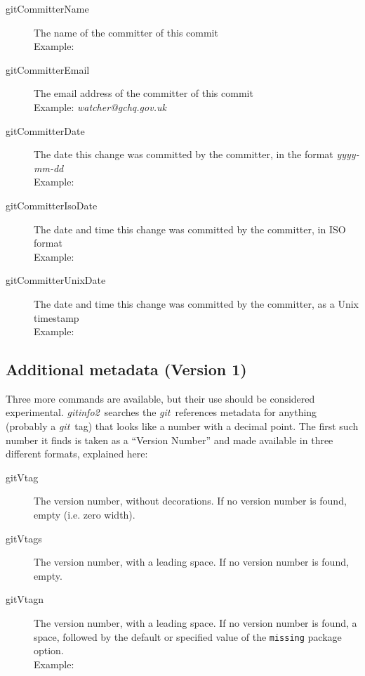 \documentclass[a4paper,12pt,twoside,openany]{memoir}
\makeatletter
\newcommand{\sfit}[1]{\textit{#1}}
\newcommand{\git}{\sfit{git}}
\newcommand*{\emailat}{@}
\newcommand{\tpname}{\sfit{gitinfo2}}
\makeatother
\begin{document}
\begin{description}
\item[gitCommitterName]
    The name of the committer of this commit\\
    Example: \textit{\gitCommitterName}

\item[gitCommitterEmail]
    The email address of the committer of this commit\\
    Example: \textit{watcher\emailat gchq.gov.uk}

\item[gitCommitterDate]
    The date this change was committed by the committer,
    in the format \textit{yyyy-mm-dd}\\
    Example: \textit{\gitCommitterDate}

\item[gitCommitterIsoDate]
    The date and time this change was committed by the committer,
    in ISO format\\
    Example: \textit{\gitCommitterIsoDate}

\item[gitCommitterUnixDate]
    The date and time this change was committed by the committer,
    as a Unix timestamp\\
    Example: \textit{\gitCommitterUnixDate}

\end{description}


\subsection{Additional metadata (Version 1)}

Three more commands are available, but their use should be considered
experimental. \tpname\ searches the \git\ references metadata for
anything (probably a \git\ tag) that looks like a number with a decimal point.
The first such number it finds is taken as a ``Version Number''
and made available in three different formats, explained here:

\begin{description}
\item[gitVtag]
    The version number, without decorations. If no version number is found,
    empty (i.e. zero width).
\item[gitVtags]
    The version number, with a leading space. If no version number is found,
    empty.
\item[gitVtagn]
    The version number, with a leading space.
    If no version number is found, a space,
    followed by the default or specified value of
    the \texttt{missing} package option.\\
    Example: \textit{\gitVtagn}
\end{description}
\end{document}
